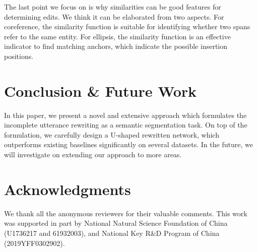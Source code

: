 \documentclass[11pt,a4paper]{article}
\begin{document}
The last point we focus on is why similarities can be good features for determining edits. We think it can be elaborated from two aspects. For coreference, the similarity function is suitable for identifying whether two spans refer to the same entity. For ellipsis, the similarity function is an effective indicator to find matching anchors, which indicate the possible insertion positions.

\section{Conclusion \& Future Work}

In this paper, we present a novel and extensive approach which formulates the incomplete utterance rewriting as a semantic segmentation task. On top of the formulation, we carefully design a U-shaped rewritten network, which outperforms existing baselines significantly on several datasets. In the future, we will investigate on extending our approach to more areas.

\section*{Acknowledgments}

We thank all the anonymous reviewers for their valuable comments. This work was supported in part by National Natural Science Foundation of China (U1736217 and 61932003), and National Key R\&D Program of China (2019YFF0302902).



\end{document}
